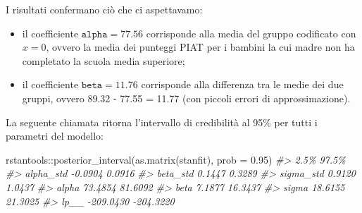 \documentclass[
  10pt,
  italian,
  a4paper,
  extrafontsizes,onecolumn,openright
  ]{memoir}
\newenvironment{Shaded}{\begin{snugshade}}{\end{snugshade}}
\newcommand{\AttributeTok}[1]{\textcolor[rgb]{0.77,0.63,0.00}{#1}}
\newcommand{\CommentTok}[1]{\textcolor[rgb]{0.56,0.35,0.01}{\textit{#1}}}
\newcommand{\FloatTok}[1]{\textcolor[rgb]{0.00,0.00,0.81}{#1}}
\newcommand{\FunctionTok}[1]{\textcolor[rgb]{0.00,0.00,0.00}{#1}}
\newcommand{\NormalTok}[1]{#1}
\newcommand{\SpecialCharTok}[1]{\textcolor[rgb]{0.00,0.00,0.00}{#1}}
\newcommand{\StringTok}[1]{\textcolor[rgb]{0.31,0.60,0.02}{#1}}
\providecommand{\tightlist}{%
  \setlength{\itemsep}{0pt}\setlength{\parskip}{0pt}}
\begin{document}
\begin{Shaded}
\end{Shaded}

I risultati confermano ciò che ci aspettavamo:

\begin{itemize}
\tightlist
\item
  il coefficiente \(\texttt{alpha} = 77.56\) corrisponde alla media del gruppo codificato con \(x = 0\), ovvero la media dei punteggi PIAT per i bambini la cui madre non ha completato la scuola media superiore;
\item
  il coefficiente \(\texttt{beta} = 11.76\) corrisponde alla differenza tra le medie dei due gruppi, ovvero 89.32 - 77.55 = 11.77 (con piccoli errori di approssimazione).
\end{itemize}

La seguente chiamata ritorna l'intervallo di credibilità al 95\% per tutti i parametri del modello:

\begin{Shaded}
\begin{Highlighting}[]
\NormalTok{rstantools}\SpecialCharTok{::}\FunctionTok{posterior\_interval}\NormalTok{(}\FunctionTok{as.matrix}\NormalTok{(stanfit), }\AttributeTok{prob =} \FloatTok{0.95}\NormalTok{)}
\CommentTok{\#\textgreater{}                2.5\%     97.5\%}
\CommentTok{\#\textgreater{} alpha\_std   {-}0.0904    0.0916}
\CommentTok{\#\textgreater{} beta\_std     0.1447    0.3289}
\CommentTok{\#\textgreater{} sigma\_std    0.9120    1.0437}
\CommentTok{\#\textgreater{} alpha       73.4854   81.6092}
\CommentTok{\#\textgreater{} beta         7.1877   16.3437}
\CommentTok{\#\textgreater{} sigma       18.6155   21.3025}
\CommentTok{\#\textgreater{} lp\_\_      {-}209.0430 {-}204.3220}
\end{Highlighting}
\end{Shaded}
\end{document}
